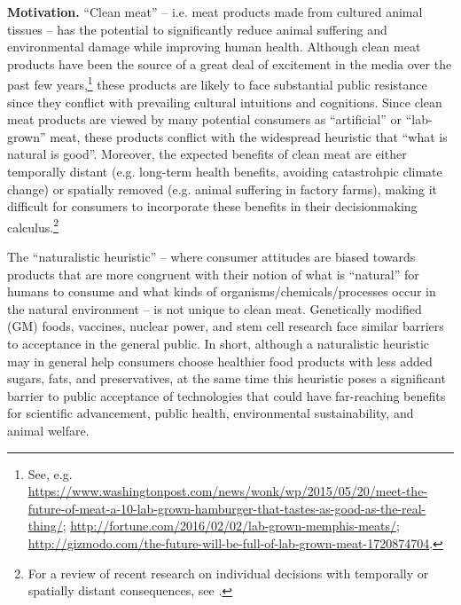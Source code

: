 \documentclass[12pt]{article}
\begin{document}
\textbf{Motivation.} ``Clean meat'' -- i.e. meat products made from cultured animal tissues -- has the potential to significantly reduce animal suffering and environmental damage while improving human health. Although clean meat products have been the source of a great deal of excitement in the media over the past few years,\footnote{See, e.g. \href{https://www.washingtonpost.com/news/wonk/wp/2015/05/20/meet-the-future-of-meat-a-10-lab-grown-hamburger-that-tastes-as-good-as-the-real-thing/}{https://www.washingtonpost.com/news/wonk/wp/2015/05/20/meet-the-future-of-meat-a-10-lab-grown-hamburger-that-tastes-as-good-as-the-real-thing/}; \href{http://fortune.com/2016/02/02/lab-grown-memphis-meats/}{http://fortune.com/2016/02/02/lab-grown-memphis-meats/}; \href{http://gizmodo.com/the-future-will-be-full-of-lab-grown-meat-1720874704}{http://gizmodo.com/the-future-will-be-full-of-lab-grown-meat-1720874704}.} these products are likely to face substantial public resistance since they conflict with prevailing cultural intuitions and cognitions. Since clean meat products are viewed by many potential consumers as ``artificial'' or ``lab-grown'' meat, these products conflict with the widespread heuristic that ``what is natural is good''. Moreover, the expected benefits of clean meat are either temporally distant (e.g. long-term health benefits, avoiding catastrohpic climate change) or spatially removed (e.g. animal suffering in factory farms), making it difficult for consumers to incorporate these benefits in their decisionmaking calculus.\footnote{For a review of recent research on individual decisions with temporally or spatially distant consequences, see \citet{Wade-Benzoni2009,Markowitz2012}.}


The ``naturalistic heuristic'' -- where consumer attitudes are biased towards products that are more congruent with their notion of what is ``natural'' for humans to consume and what kinds of organisms/chemicals/processes occur in the natural environment -- is not unique to clean meat. Genetically modified (GM) foods, vaccines, nuclear power, and stem cell research face similar barriers to acceptance in the general public. In short, although a naturalistic heuristic may in general help consumers choose healthier food products with less added sugars, fats, and preservatives, at the same time this heuristic poses a significant barrier to public acceptance of technologies that could have far-reaching benefits for scientific advancement, public health, environmental sustainability, and animal welfare.
\end{document}
